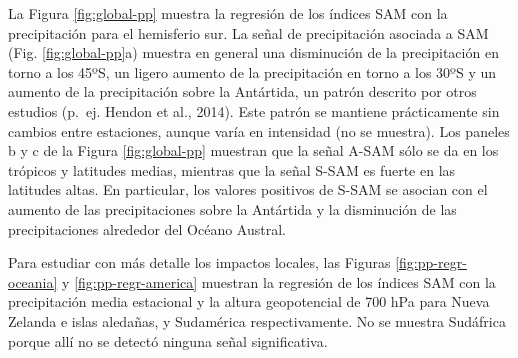 \documentclass[12pt,oneside]{reedthesis}
\begin{document}
La Figura \ref{fig:global-pp} muestra la regresión de los índices SAM con la precipitación para el hemisferio sur.
La señal de precipitación asociada a SAM (Fig. \ref{fig:global-pp}a) muestra en general una disminución de la precipitación en torno a los 45ºS, un ligero aumento de la precipitación en torno a los 30ºS y un aumento de la precipitación sobre la Antártida, un patrón descrito por otros estudios (p.~ej. Hendon et al., 2014).
Este patrón se mantiene prácticamente sin cambios entre estaciones, aunque varía en intensidad (no se muestra).
Los paneles b y c de la Figura \ref{fig:global-pp} muestran que la señal A-SAM sólo se da en los trópicos y latitudes medias, mientras que la señal S-SAM es fuerte en las latitudes altas.
En particular, los valores positivos de S-SAM se asocian con el aumento de las precipitaciones sobre la Antártida y la disminución de las precipitaciones alrededor del Océano Austral.

Para estudiar con más detalle los impactos locales, las Figuras \ref{fig:pp-regr-oceania} y \ref{fig:pp-regr-america} muestran la regresión de los índices SAM con la precipitación media estacional y la altura geopotencial de 700 hPa para Nueva Zelanda e islas aledañas, y Sudamérica respectivamente.
No se muestra Sudáfrica porque allí no se detectó ninguna señal significativa.
\end{document}
